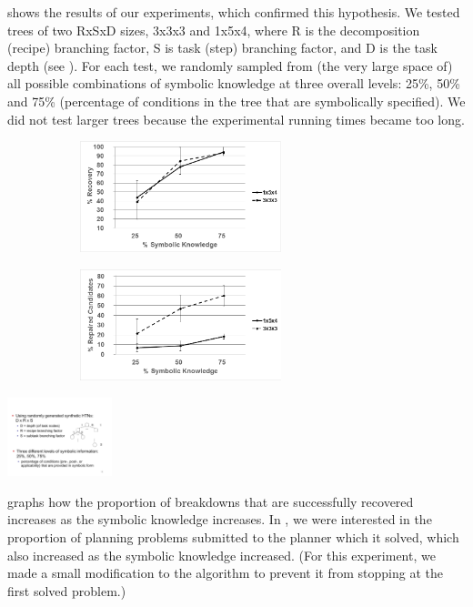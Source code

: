 \documentclass{llncs}
\begin{document}
 shows the results of our experiments, which confirmed
this hypothesis.  We tested trees of two RxSxD sizes, 3x3x3 and 1x5x4,
where R is the decomposition (recipe) branching factor, S is task
(step) branching factor, and D is the task depth (see ).
For each test, we randomly sampled from (the very large space of) all
possible combinations of symbolic knowledge at three overall levels:
25\%, 50\% and 75\% (percentage of conditions in the tree that are
symbolically specified).  We did not test larger trees because the
experimental running times became too long.

\begin{figure}[t]
\centering
\begin{subfigure}{2.3in}
\centerline{\includegraphics[width=2.3in]{figs/recovery}}
\vskip 8pt 
\end{subfigure}
\hfill
\begin{subfigure}{2.3in}
\centerline{\includegraphics[width=2.3in]{figs/candidates}}
\vskip 8pt 
\end{subfigure}
\vskip 6pt
 \end{figure}

\begin{floatingfigure}{1.25in}
\centerline{\includegraphics[width=1.2in]{figs/dimen}}
\vskip 4pt
\end{floatingfigure} 

 graphs how the proportion of breakdowns that are
successfully recovered increases as the symbolic knowledge
increases. In , we were interested in the proportion
of planning problems submitted to the planner which it solved, which
also increased as the symbolic knowledge increased.  (For this
experiment, we made a small modification to the algorithm to prevent it
from stopping at the first solved problem.)

\vskip 4pt


\end{document}
